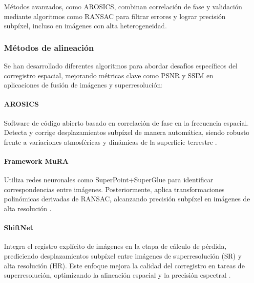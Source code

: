                 Métodos avanzados, como AROSICS, combinan correlación de fase y validación mediante algoritmos como RANSAC para filtrar errores y lograr precisión subpíxel, incluso en imágenes con alta heterogeneidad.

        
        \subsubsection{Métodos de alineación}

            Se han desarrollado diferentes algoritmos para abordar desafíos específicos del corregistro espacial, mejorando métricas clave como PSNR y SSIM en aplicaciones de fusión de imágenes y superresolución:
            
            \paragraph{AROSICS} 
            
                Software de código abierto basado en correlación de fase en la frecuencia espacial. Detecta y corrige desplazamientos subpíxel de manera automática, siendo robusto frente a variaciones atmosféricas y dinámicas de la superficie terrestre \autocite{scheffler2017arosics}.
            
            \paragraph{Framework MuRA} 
            
                Utiliza redes neuronales como SuperPoint+SuperGlue para identificar correspondencias entre imágenes. Posteriormente, aplica transformaciones polinómicas derivadas de RANSAC, alcanzando precisión subpíxel en imágenes de alta resolución \autocite{deshmukh2023aligned}.
                
            \paragraph{ShiftNet} 
            
                Integra el registro explícito de imágenes en la etapa de cálculo de pérdida, prediciendo desplazamientos subpíxel entre imágenes de superresolución (SR) y alta resolución (HR). Este enfoque mejora la calidad del corregistro en tareas de superresolución, optimizando la alineación espacial y la precisión espectral \autocite{deudon2020highres}.
            


